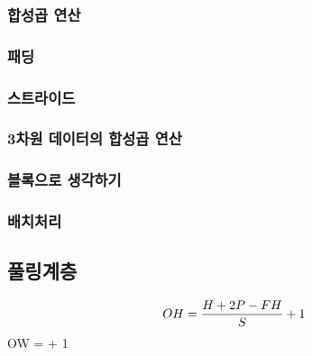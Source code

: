 \documentclass[11pt]{article}
\begin{document}
\subsubsection{합성곱 연산}
\subsubsection{패딩}
\subsubsection{스트라이드}
\subsubsection{3차원 데이터의 합성곱 연산}
\subsubsection{블록으로 생각하기}
\subsubsection{배치처리}
\subsection{풀링계층}


$$ OH = \dfrac{H+2P-FH}{S} + 1 \\

$$ OW =  + 1 \\
\end{document}
